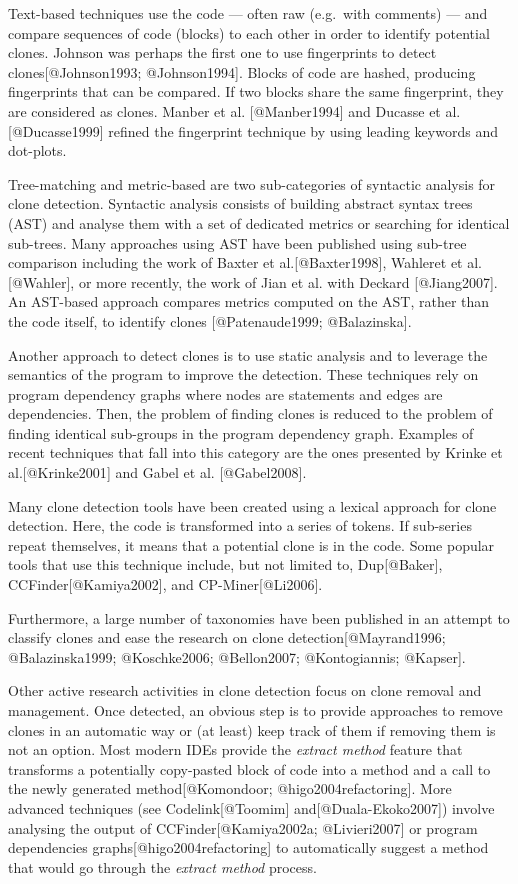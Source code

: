 Text-based techniques use the code --- often raw (e.g.~with comments)
--- and compare sequences of code (blocks) to each other in order to
identify potential clones. Johnson was perhaps the first one to use
fingerprints to detect clones{[}@Johnson1993; @Johnson1994{]}. Blocks of
code are hashed, producing fingerprints that can be compared. If two
blocks share the same fingerprint, they are considered as clones. Manber
et al. {[}@Manber1994{]} and Ducasse et al.{[}@Ducasse1999{]} refined
the fingerprint technique by using leading keywords and dot-plots.

Tree-matching and metric-based are two sub-categories of syntactic
analysis for clone detection. Syntactic analysis consists of building
abstract syntax trees (AST) and analyse them with a set of dedicated
metrics or searching for identical sub-trees. Many approaches using AST
have been published using sub-tree comparison including the work of
Baxter et al.{[}@Baxter1998{]}, Wahleret et al. {[}@Wahler{]}, or more
recently, the work of Jian et al. with Deckard {[}@Jiang2007{]}. An
AST-based approach compares metrics computed on the AST, rather than the
code itself, to identify clones {[}@Patenaude1999; @Balazinska{]}.

Another approach to detect clones is to use static analysis and to
leverage the semantics of the program to improve the detection. These
techniques rely on program dependency graphs where nodes are statements
and edges are dependencies. Then, the problem of finding clones is
reduced to the problem of finding identical sub-groups in the program
dependency graph. Examples of recent techniques that fall into this
category are the ones presented by Krinke et al.{[}@Krinke2001{]} and
Gabel et al. {[}@Gabel2008{]}.

Many clone detection tools have been created using a lexical approach
for clone detection. Here, the code is transformed into a series of
tokens. If sub-series repeat themselves, it means that a potential clone
is in the code. Some popular tools that use this technique include, but
not limited to, Dup{[}@Baker{]}, CCFinder{[}@Kamiya2002{]}, and
CP-Miner{[}@Li2006{]}.

Furthermore, a large number of taxonomies have been published in an
attempt to classify clones and ease the research on clone
detection{[}@Mayrand1996; @Balazinska1999; @Koschke2006; @Bellon2007;
@Kontogiannis; @Kapser{]}.

Other active research activities in clone detection focus on clone
removal and management. Once detected, an obvious step is to provide
approaches to remove clones in an automatic way or (at least) keep track
of them if removing them is not an option. Most modern IDEs provide the
\emph{extract method} feature that transforms a potentially copy-pasted
block of code into a method and a call to the newly generated
method{[}@Komondoor; @higo2004refactoring{]}. More advanced techniques
(see Codelink{[}@Toomim{]} and{[}@Duala-Ekoko2007{]}) involve analysing
the output of CCFinder{[}@Kamiya2002a; @Livieri2007{]} or program
dependencies graphs{[}@higo2004refactoring{]} to automatically suggest a
method that would go through the \emph{extract method} process.

